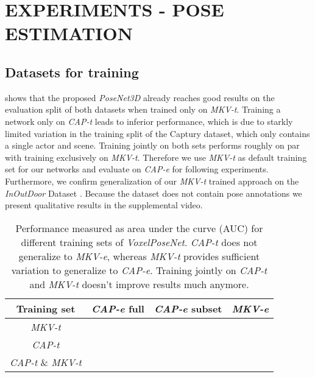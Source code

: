 \section{EXPERIMENTS - POSE ESTIMATION}

\subsection{Datasets for training}
 shows that the proposed \textit{PoseNet3D} already reaches good results on the evaluation split of both datasets when trained only on \textit{MKV-t}. Training a network only on \textit{CAP-t} leads to inferior performance, which is due to starkly limited variation in the training split of the Captury dataset, which only contains a single actor and scene. Training jointly on both sets performs roughly on par with training exclusively on \textit{MKV-t}. Therefore we use \textit{MKV-t} as default training set for our networks and evaluate on \textit{CAP-e} for following experiments. Furthermore, we confirm generalization of our \textit{MKV-t} trained approach on the \textit{InOutDoor} Dataset \cite{mees2016choosing}. Because the dataset does not contain pose annotations we present qualitative results in the supplemental video.

\begin{table}
\begin{center}
\begin{tabular}{|c|c|c|c|}
\hline
 Training set & \textit{CAP-e} full & \textit{CAP-e} subset & \textit{MKV-e} \\
\hline\hline
\textit{MKV-t}                      &   &   & \\
\textit{CAP-t}                      &   &   & \\
\textit{CAP-t} \& \textit{MKV-t}    &   &   & \\
\hline
\end{tabular}
\caption{Performance measured as area under the curve (AUC) for different training sets of \textit{VoxelPoseNet}. \textit{CAP-t} does not generalize to \textit{MKV-e}, whereas \textit{MKV-t} provides sufficient variation to generalize to \textit{CAP-e}. Training jointly on \textit{CAP-t} and \textit{MKV-t} doesn't improve results much anymore. }\label{tab:train_sets}
\end{center}
\end{table}

